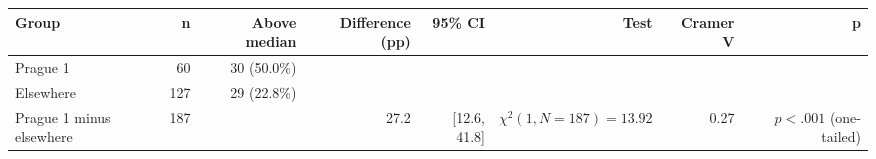 \begin{tabular}{lrrrrrrr}
\toprule
Group & n & Above median & Difference (pp) & 95\% CI & Test & Cramer V & p \\
\midrule
Prague 1 & 60 & 30 (50.0\%) &  &  &  &  &  \\
Elsewhere & 127 & 29 (22.8\%) &  &  &  &  &  \\
Prague 1 minus elsewhere & 187 &  & 27.2 & [12.6, 41.8] & $\chi^2(1, N=187)=13.92$ & 0.27 & $p<.001$ (one-tailed) \\
\bottomrule
\end{tabular}

